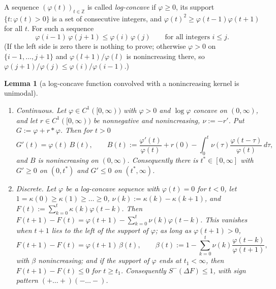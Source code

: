 \documentclass[11pt,a4paper]{article}
\newtheorem{lemma}[theorem]{Lemma}
\theoremstyle{definition}
\newcommand{\Sm}{S^{-}}
\begin{document}
A sequence $(\varphi(t))_{t\in\mathbb Z}$ is called \emph{log-concave} if $\varphi\ge0$, its support $\{t:\varphi(t)>0\}$ is a set of consecutive integers, and $\varphi(t)^2\ge\varphi(t-1)\varphi(t+1)$ for all $t$. For such a sequence
\begin{equation}\label{eq:lcbasic}
\varphi(i-1)\,\varphi(j+1)\le\varphi(i)\,\varphi(j)\qquad\text{for all integers }i\le j .
\end{equation}
(If the left side is zero there is nothing to prove; otherwise $\varphi>0$ on $\{i-1,\dots,j+1\}$ and $\varphi(l+1)/\varphi(l)$ is nonincreasing there, so $\varphi(j+1)/\varphi(j)\le\varphi(i)/\varphi(i-1)$.)

\begin{lemma}[a log-concave function convolved with a nonincreasing kernel is unimodal]\label{lem:ibragimov}
\begin{enumerate}
\item[(a)] \emph{Continuous.} Let $\varphi\in C^1([0,\infty))$ with $\varphi>0$ and $\log\varphi$ concave on $(0,\infty)$, and let $r\in C^1([0,\infty))$ be nonnegative and nonincreasing, $\nu:=-r'$. Put $G:=\varphi+r*\varphi$. Then for $t>0$
\begin{equation}\label{eq:B}
G'(t)=\varphi(t)\,B(t),\qquad B(t):=\frac{\varphi'(t)}{\varphi(t)}+r(0)-\int_0^t\nu(\tau)\frac{\varphi(t-\tau)}{\varphi(t)}\,d\tau ,
\end{equation}
and $B$ is nonincreasing on $(0,\infty)$. Consequently there is $t^*\in[0,\infty]$ with $G'\ge0$ on $(0,t^*)$ and $G'\le0$ on $(t^*,\infty)$.
\item[(b)] \emph{Discrete.} Let $\varphi$ be a log-concave sequence with $\varphi(t)=0$ for $t<0$, let $1=\kappa(0)\ge\kappa(1)\ge\dots\ge0$, $\nu(k):=\kappa(k)-\kappa(k+1)$, and $F(t):=\sum_{k=0}^t\kappa(k)\varphi(t-k)$. Then $F(t+1)-F(t)=\varphi(t+1)-\sum_{k=0}^t\nu(k)\varphi(t-k)$. This vanishes when $t+1$ lies to the left of the support of $\varphi$; as long as $\varphi(t+1)>0$,
\[
F(t+1)-F(t)=\varphi(t+1)\,\beta(t),\qquad \beta(t):=1-\sum_{k=0}^t\nu(k)\frac{\varphi(t-k)}{\varphi(t+1)},
\]
with $\beta$ nonincreasing; and if the support of $\varphi$ ends at $t_1<\infty$, then $F(t+1)-F(t)\le0$ for $t\ge t_1$. Consequently $\Sm(\Delta F)\le1$, with sign pattern $(+\dots+)(-\dots-)$.
\end{enumerate}
\end{lemma}
\end{document}
